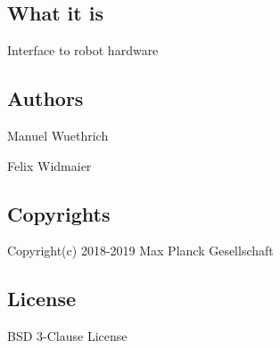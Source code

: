 \subsection*{What it is}

Interface to robot hardware

\subsection*{Authors}

Manuel Wuethrich

Felix Widmaier

\subsection*{Copyrights}

Copyright(c) 2018-\/2019 Max Planck Gesellschaft

\subsection*{License}

B\+SD 3-\/\+Clause License 